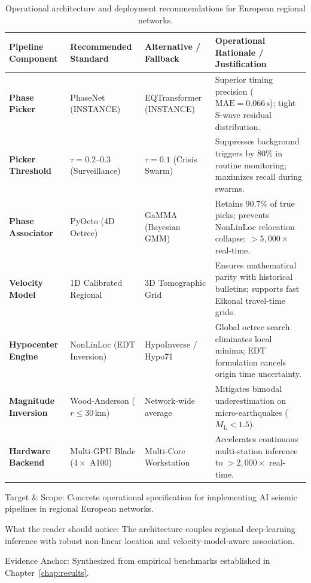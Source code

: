 \begin{table}[htbp]
  \centering
  \small
  \caption{Operational architecture and deployment recommendations for European regional networks.}
  \label{tab:recommendations_matrix}
  \begin{threeparttable}
    \begin{tabularx}{\linewidth}{l l l X}
      \toprule
      \textbf{Pipeline Component} & \textbf{Recommended Standard} & \textbf{Alternative / Fallback} & \textbf{Operational Rationale / Justification} \\
      \midrule
      \textbf{Phase Picker} & PhaseNet (INSTANCE) & EQTransformer (INSTANCE) & Superior timing precision ($\mathrm{MAE} = 0.066\,\unit{\second}$); tight S-wave residual distribution. \\
      \textbf{Picker Threshold} & $\tau = 0.2\text{--}0.3$ (Surveillance) & $\tau = 0.1$ (Crisis Swarm) & Suppresses background triggers by $80\%$ in routine monitoring; maximizes recall during swarms. \\
      \textbf{Phase Associator} & PyOcto (4D Octree) & GaMMA (Bayesian GMM) & Retains $90.7\%$ of true picks; prevents NonLinLoc relocation collapse; $>5{,}000\times$ real-time. \\
      \textbf{Velocity Model} & 1D Calibrated Regional & 3D Tomographic Grid & Ensures mathematical parity with historical bulletins; supports fast Eikonal travel-time grids. \\
      \textbf{Hypocenter Engine} & NonLinLoc (EDT Inversion) & HypoInverse / Hypo71 & Global octree search eliminates local minima; EDT formulation cancels origin time uncertainty. \\
      \textbf{Magnitude Inversion} & Wood-Anderson ($r \le 30\,\unit{\kilo\meter}$) & Network-wide average & Mitigates bimodal underestimation on micro-earthquakes ($M_{\mathrm{L}} < 1.5$). \\
      \textbf{Hardware Backend} & Multi-GPU Blade ($4\times$ A100) & Multi-Core Workstation & Accelerates continuous multi-station inference to $>2{,}000\times$ real-time. \\
      \bottomrule
    \end{tabularx}
    \begin{tablenotes}[flushleft]
      \footnotesize
      \item Target \& Scope: Concrete operational specification for implementing AI seismic pipelines in regional European networks.
      \item What the reader should notice: The architecture couples regional deep-learning inference with robust non-linear location and velocity-model-aware association.
      \item Evidence Anchor: Synthesized from empirical benchmarks established in Chapter~\ref{chap:results}.
    \end{tablenotes}
  \end{threeparttable}
\end{table}

